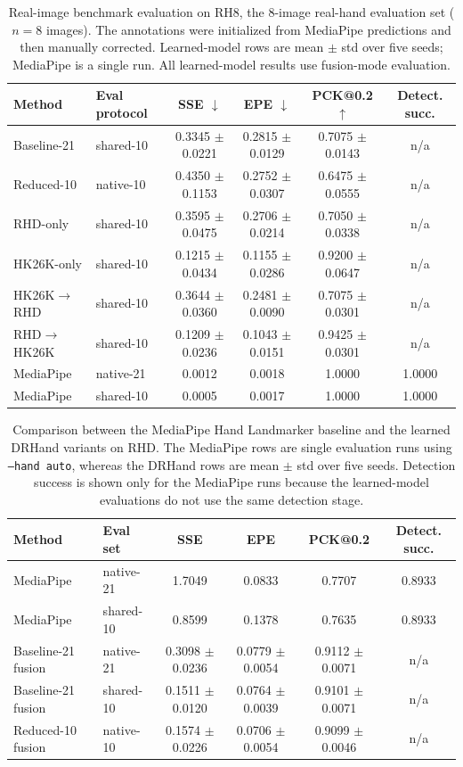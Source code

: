 \documentclass[10pt,letterpaper]{article}
\begin{document}
\begin{table}[H]
\centering
\footnotesize
\caption{Real-image benchmark evaluation on RH8, the 8-image real-hand evaluation set ($n=8$ images). The annotations were initialized from MediaPipe predictions and then manually corrected. Learned-model rows are mean $\pm$ std over five seeds; MediaPipe is a single run. All learned-model results use fusion-mode evaluation.}
\label{tab:hand_frame_small_pilot}
\begin{tabular}{llcccc}
\toprule
Method & Eval protocol & SSE $\downarrow$ & EPE $\downarrow$ & PCK@0.2 $\uparrow$ & Detect. succ. \\
\midrule
Baseline-21 & shared-10 & 0.3345 $\pm$ 0.0221 & 0.2815 $\pm$ 0.0129 & 0.7075 $\pm$ 0.0143 & n/a \\
Reduced-10 & native-10 & 0.4350 $\pm$ 0.1153 & 0.2752 $\pm$ 0.0307 & 0.6475 $\pm$ 0.0555 & n/a \\
RHD-only & shared-10 & 0.3595 $\pm$ 0.0475 & 0.2706 $\pm$ 0.0214 & 0.7050 $\pm$ 0.0338 & n/a \\
HK26K-only & shared-10 & 0.1215 $\pm$ 0.0434 & 0.1155 $\pm$ 0.0286 & 0.9200 $\pm$ 0.0647 & n/a \\
HK26K$\rightarrow$RHD & shared-10 & 0.3644 $\pm$ 0.0360 & 0.2481 $\pm$ 0.0090 & 0.7075 $\pm$ 0.0301 & n/a \\
RHD$\rightarrow$HK26K & shared-10 & 0.1209 $\pm$ 0.0236 & 0.1043 $\pm$ 0.0151 & 0.9425 $\pm$ 0.0301 & n/a \\
MediaPipe & native-21 & 0.0012 & 0.0018 & 1.0000 & 1.0000 \\
MediaPipe & shared-10 & 0.0005 & 0.0017 & 1.0000 & 1.0000 \\
\bottomrule
\end{tabular}
\end{table}

\begin{table}[H]
\centering
\footnotesize
\caption{Comparison between the MediaPipe Hand Landmarker baseline and the learned DRHand variants on RHD. The MediaPipe rows are single evaluation runs using \texttt{--hand auto}, whereas the DRHand rows are mean $\pm$ std over five seeds. Detection success is shown only for the MediaPipe runs because the learned-model evaluations do not use the same detection stage.}
\label{tab:mediapipe_baseline}
\begin{tabular}{llcccc}
\toprule
Method & Eval set & SSE & EPE & PCK@0.2 & Detect. succ. \\
\midrule
MediaPipe & native-21 & 1.7049 & 0.0833 & 0.7707 & 0.8933 \\
MediaPipe & shared-10 & 0.8599 & 0.1378 & 0.7635 & 0.8933 \\
Baseline-21 fusion & native-21 & 0.3098 $\pm$ 0.0236 & 0.0779 $\pm$ 0.0054 & 0.9112 $\pm$ 0.0071 & n/a \\
Baseline-21 fusion & shared-10 & 0.1511 $\pm$ 0.0120 & 0.0764 $\pm$ 0.0039 & 0.9101 $\pm$ 0.0071 & n/a \\
Reduced-10 fusion & native-10 & 0.1574 $\pm$ 0.0226 & 0.0706 $\pm$ 0.0054 & 0.9099 $\pm$ 0.0046 & n/a \\
\bottomrule
\end{tabular}
\end{table}
\end{document}
